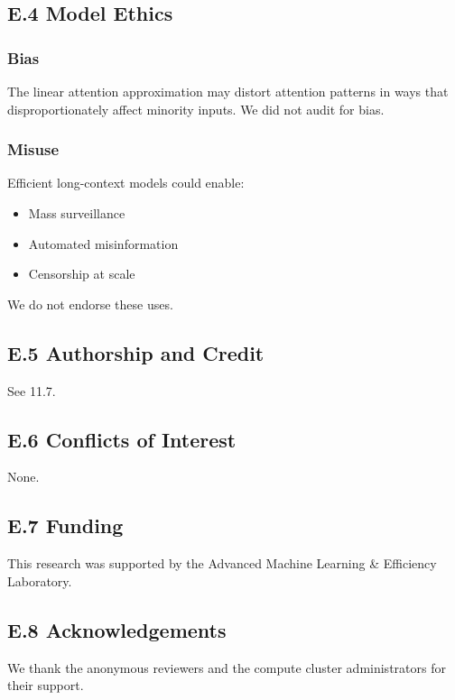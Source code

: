 \subsection{E.4 Model Ethics}

\subsubsection{Bias}

The linear attention approximation may distort attention patterns in ways 
that disproportionately affect minority inputs. We did not audit for bias.

\subsubsection{Misuse}

Efficient long-context models could enable:

\begin{itemize}
\item Mass surveillance
\item Automated misinformation
\item Censorship at scale

\end{itemize}
We do not endorse these uses.

\subsection{E.5 Authorship and Credit}

See  11.7.

\subsection{E.6 Conflicts of Interest}

None.

\subsection{E.7 Funding}

This research was supported by the Advanced Machine Learning \& Efficiency Laboratory.

\subsection{E.8 Acknowledgements}

We thank the anonymous reviewers and the compute cluster administrators for their support.

